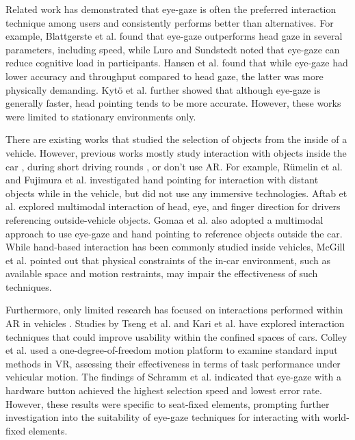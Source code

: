 Related work has demonstrated that eye-gaze is often the preferred interaction technique among users and consistently performs better than alternatives. For example, Blattgerste et al. \cite{blattgerste2018advantages} found that eye-gaze outperforms head gaze in several parameters, including speed, while Luro and Sundstedt \cite{luro2019comparative} noted that eye-gaze can reduce cognitive load in participants. Hansen et al. \cite{hansen2018fitts} found that while eye-gaze had lower accuracy and throughput compared to head gaze, the latter was more physically demanding. Kyt{\"o} et al. \cite{kyto2018pinpointing} further showed that although eye-gaze is generally faster, head pointing tends to be more accurate. However, these works were limited to stationary environments only.

There are existing works that studied the selection of objects from the inside of a vehicle. However, previous works mostly study interaction with objects inside the car \cite{aftab2020point}, during short driving rounds \cite{gomaa2020studying}, or don't use AR. For example, R{\"u}melin et al. \cite{rumelin2013free} and Fujimura et al. \cite{fujimura2013driver} investigated hand pointing for interaction with distant objects while in the vehicle, but did not use any immersive technologies. Aftab et al. \cite{aftab2021multimodal, aftab2022pointingoutside} explored multimodal interaction of head, eye, and finger direction for drivers referencing outside-vehicle objects. Gomaa et al. \cite{gomaa2020studying} also adopted a multimodal approach to use eye-gaze and hand pointing to reference objects outside the car. While hand-based interaction has been commonly studied inside vehicles, McGill et al. \cite{mcgill2020challenges} pointed out that physical constraints of the in-car environment, such as available space and motion restraints, may impair the effectiveness of such techniques.

Furthermore, only limited research has focused on interactions performed within AR in vehicles \cite{Schramm2023Assessing, colley2022swivr, kari2023handycast, Tseng2023FingerMapper}. Studies by Tseng et al. \cite{Tseng2023FingerMapper} and Kari et al. \cite{kari2023handycast} have explored interaction techniques that could improve usability within the confined spaces of cars. Colley et al. \cite{colley2022swivr} used a one-degree-of-freedom motion platform to examine standard input methods in VR, assessing their effectiveness in terms of task performance under vehicular motion. The findings of Schramm et al. \cite{Schramm2023Assessing} indicated that eye-gaze with a hardware button achieved the highest selection speed and lowest error rate. However, these results were specific to seat-fixed elements, prompting further investigation into the suitability of eye-gaze techniques for interacting with world-fixed elements.


